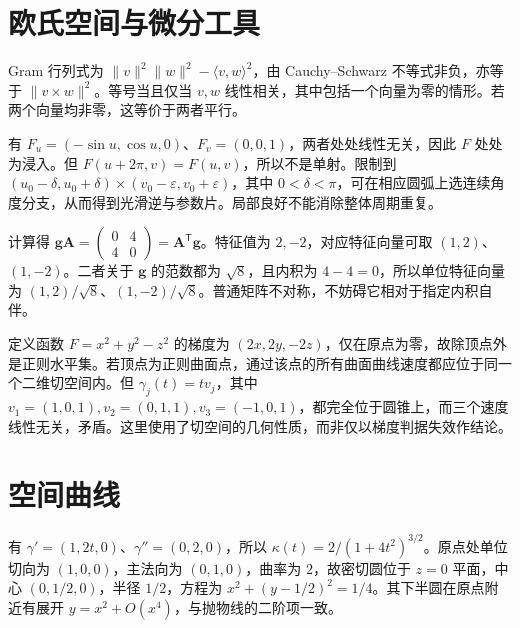\documentclass[UTF8,12pt,a4paper,fontset=fandol]{ctexbook}
\newcommand{\ip}[2]{\langle #1,#2\rangle}
\newcommand{\norm}[1]{\lVert #1\rVert}
\begin{document}
\section{欧氏空间与微分工具}
\begin{solve}
Gram 行列式为 $\norm v^2\norm w^2-\ip vw^2$，由 Cauchy--Schwarz 不等式非负，亦等于 $\norm{v\times w}^2$。等号当且仅当 $v,w$ 线性相关，其中包括一个向量为零的情形。若两个向量均非零，这等价于两者平行。
\end{solve}

\begin{solve}
有 $F_u=(-\sin u,\cos u,0)$、$F_v=(0,0,1)$，两者处处线性无关，因此 $F$ 处处为浸入。但 $F(u+2\pi,v)=F(u,v)$，所以不是单射。限制到 $(u_0-\delta,u_0+\delta)\times(v_0-\varepsilon,v_0+\varepsilon)$，其中 $0<\delta<\pi$，可在相应圆弧上选连续角度分支，从而得到光滑逆与参数片。局部良好不能消除整体周期重复。
\end{solve}

\begin{solve}
计算得 $\mathbf g\mathbf A=\begin{pmatrix}0&4\\4&0\end{pmatrix}=\mathbf A^{\mathsf T}\mathbf g$。特征值为 $2,-2$，对应特征向量可取 $(1,2)$、$(1,-2)$。二者关于 $\mathbf g$ 的范数都为 $\sqrt8$，且内积为 $4-4=0$，所以单位特征向量为 $(1,2)/\sqrt8$、$(1,-2)/\sqrt8$。普通矩阵不对称，不妨碍它相对于指定内积自伴。
\end{solve}

\begin{solve}
定义函数 $F=x^2+y^2-z^2$ 的梯度为 $(2x,2y,-2z)$，仅在原点为零，故除顶点外是正则水平集。若顶点为正则曲面点，通过该点的所有曲面曲线速度都应位于同一个二维切空间内。但 $\gamma_j(t)=tv_j$，其中 $v_1=(1,0,1),v_2=(0,1,1),v_3=(-1,0,1)$，都完全位于圆锥上，而三个速度线性无关，矛盾。这里使用了切空间的几何性质，而非仅以梯度判据失效作结论。
\end{solve}

\section{空间曲线}
\begin{solve}
有 $\gamma'=(1,2t,0)$、$\gamma''=(0,2,0)$，所以 $\kappa(t)=2/(1+4t^2)^{3/2}$。原点处单位切向为 $(1,0,0)$，主法向为 $(0,1,0)$，曲率为 $2$，故密切圆位于 $z=0$ 平面，中心 $(0,1/2,0)$，半径 $1/2$，方程为 $x^2+(y-1/2)^2=1/4$。其下半圆在原点附近有展开 $y=x^2+O(x^4)$，与抛物线的二阶项一致。
\end{solve}
\end{document}
